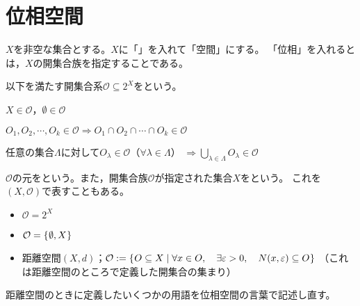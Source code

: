 \documentclass[uplatex]{jsarticle}
\begin{document}
\fi
\renewcommand{\thesubsection}{\thepart.\arabic{section}.\arabic{subsection}}
  
\section{位相空間}


$X$を非空な集合とする。$X$に「」を入れて「空間」にする。
「位相」を入れるとは，$X$の開集合族を指定することである。

\begin{teigi}[位相]
  以下を満たす開集合系$\mathcal{O} \subseteq 2^{X}$をという。

   $X \in \mathcal{O}$，$\emptyset \in \mathcal{O}$

   $O_{1}, O_{2}, \cdots, O_{k} \in \mathcal{O} \Longrightarrow O_{1} \cap O_{2} \cap \cdots \cap O_{k} \in \mathcal{O}$

   任意の集合$\Lambda$に対して$O_{\lambda} \in \mathcal{O}$（$\forall \lambda \in \Lambda$） ${\displaystyle \Longrightarrow \bigcup_{\lambda \in \Lambda} O_{\lambda} \in \mathcal{O}}$

  $\mathcal{O}$の元をという。また，開集合族$\mathcal{O}$が指定された集合$X$をという。
  これを$(X,\mathcal{O})$で表すこともある。
\end{teigi}

\begin{rei}
  \begin{itemize}
    \item {} $\mathcal{O} = 2^{X}$
    \item {} $\mathcal{O} = \Set{\hspace{-1.8pt} \emptyset, X \hspace{-1.8pt}}$
    \item 距離空間$(X,d)$；$\mathcal{O} := \Set{\hspace{-1.8pt} O \subseteq X | \forall x \in O, \quad \exists \varepsilon > 0, \quad N(x, \varepsilon) \subseteq O \hspace{-1.8pt}}$
    （これは距離空間のところで定義した開集合の集まり）
  \end{itemize}
\end{rei}

距離空間のときに定義したいくつかの用語を位相空間の言葉で記述し直す。
\end{document}
